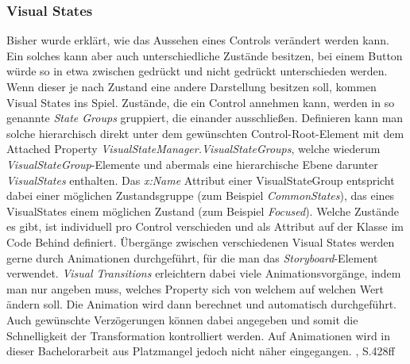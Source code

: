 \documentclass[a4paper,bibtotoc,oneside]{scrbook}
\begin{document}
\subsubsection[Visual States]{Visual States}\label{ref:visualstates}
Bisher wurde erklärt, wie das Aussehen eines Controls verändert werden kann. Ein solches kann aber auch unterschiedliche Zustände besitzen, bei einem Button würde so in etwa zwischen gedrückt und nicht gedrückt unterschieden werden. Wenn dieser je nach Zustand eine andere Darstellung besitzen soll, kommen Visual States ins Spiel.
\newline
\newline
Zustände, die ein Control annehmen kann, werden in so genannte \textit{State Groups} gruppiert, die einander ausschließen. Definieren kann man solche hierarchisch direkt unter dem gewünschten Control-Root-Element mit dem Attached Property \textit{VisualStateManager.VisualStateGroups}, welche wiederum \textit{VisualStateGroup}-Elemente und abermals eine hierarchische Ebene darunter \textit{VisualStates} enthalten.
\newline
Das \textit{x:Name} Attribut einer VisualStateGroup entspricht dabei einer möglichen Zustandsgruppe (zum Beispiel \textit{CommonStates}), das eines VisualStates einem möglichen Zustand (zum Beispiel \textit{Focused}). Welche Zustände es gibt, ist individuell pro Control verschieden und als Attribut auf der Klasse im Code Behind definiert.
\newline
\newline
Übergänge zwischen verschiedenen Visual States werden gerne durch Animationen durchgeführt, für die man das \textit{Storyboard}-Element verwendet. \textit{Visual Transitions} erleichtern dabei viele Animationsvorgänge, indem man nur angeben muss, welches Property sich von welchem auf welchen Wert ändern soll. Die Animation wird dann berechnet und automatisch durchgeführt. Auch gewünschte Verzögerungen können dabei angegeben und somit die Schnelligkeit der Transformation kontrolliert werden.
\newline
Auf Animationen wird in dieser Bachelorarbeit aus Platzmangel jedoch nicht näher eingegangen. \cite{ana12}, S.428ff
\end{document}
